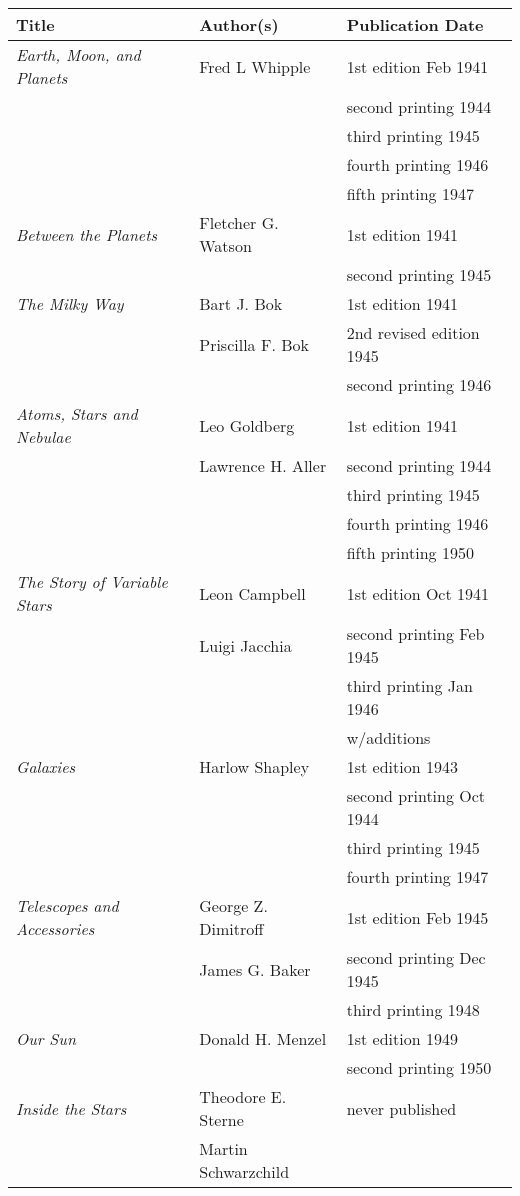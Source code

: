 \begin{tabular}{l l l}
  Title & Author(s) & Publication Date \\ \hline
  {\it Earth, Moon, and Planets} & Fred L Whipple & 1st edition Feb 1941 \\
  & & second printing 1944 \\
  & & third printing 1945 \\
  & & fourth printing 1946 \\
  & & fifth printing 1947 \\ \hline
  {\it Between the Planets} & Fletcher G. Watson & 1st edition 1941 \\
  & & second printing 1945 \\ \hline
  {\it The Milky Way} & Bart J. Bok & 1st edition 1941 \\
  &  Priscilla F. Bok & 2nd revised edition 1945 \\
  & & second printing 1946 \\ \hline
  {\it Atoms, Stars and Nebulae} & Leo Goldberg & 1st edition 1941 \\
  &  Lawrence H. Aller & second printing 1944 \\
  & & third printing 1945 \\
  & & fourth printing 1946 \\
  & & fifth printing 1950 \\ \hline
  {\it The Story of Variable Stars} & Leon Campbell &1st edition Oct 1941 \\
  &  Luigi Jacchia & second printing Feb 1945 \\
  & & third printing Jan 1946 \\
  & &  w/additions \\ \hline
  {\it Galaxies} & Harlow Shapley & 1st edition 1943 \\
  & & second printing Oct 1944 \\
  & & third printing 1945 \\
  & & fourth printing 1947 \\ \hline
  {\it Telescopes and Accessories} & George Z. Dimitroff & 1st edition Feb 1945 \\
  &  James G. Baker & second printing Dec 1945 \\
  & & third printing 1948 \\ \hline
  {\it Our Sun} & Donald H. Menzel & 1st edition 1949 \\
  & & second printing 1950 \\ \hline
  {\it Inside the Stars} &  Theodore E. Sterne & never published \\
  &  Martin Schwarzchild & \\
  \hline
\end{tabular}

